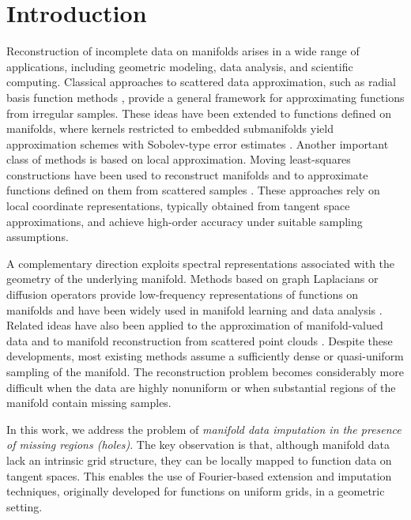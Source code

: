 \documentclass[11pt,oneside,reqno]{amsart}
\theoremstyle{plain}
\numberwithin{equation}{section}
\begin{document}
\section{Introduction}

Reconstruction of incomplete data on manifolds arises in a wide range of applications,
including geometric modeling, data analysis, and scientific computing. Classical
approaches to scattered data approximation, such as radial basis function methods
\cite{Buhmann2003,Wendland2004}, provide a general framework for approximating
functions from irregular samples. These ideas have been extended to functions defined
on manifolds, where kernels restricted to embedded submanifolds yield approximation
schemes with Sobolev-type error estimates \cite{FuselierWright2012}. Another important
class of methods is based on local approximation. Moving least-squares constructions
have been used to reconstruct manifolds and to approximate functions defined on them
from scattered samples \cite{LipmanLevin2010,SoberLevin2016,SoberAizenbudLevin2017}.
These approaches rely on local coordinate representations, typically obtained from
tangent space approximations, and achieve high-order accuracy under suitable sampling
assumptions.

A complementary direction exploits spectral representations associated with the
geometry of the underlying manifold. Methods based on graph Laplacians or diffusion
operators provide low-frequency representations of functions on manifolds and have
been widely used in manifold learning and data analysis \cite{BelkinNiyogi2003,
CoifmanLafon2006}. Related ideas have also been applied to the approximation of
manifold-valued data and to manifold reconstruction from scattered point clouds
\cite{GrohsSprecherYu2017,FaigenbaumGolovinLevin2020}. Despite these developments,
most existing methods assume a sufficiently dense or quasi-uniform sampling of the
manifold. The reconstruction problem becomes considerably more difficult when the data
are highly nonuniform or when substantial regions of the manifold contain missing
samples.

In this work, we address the problem of \emph{manifold data imputation in the presence
of missing regions (holes)}. The key observation is that, although manifold data lack an intrinsic
grid structure, they can be locally mapped to function data on tangent spaces. This
enables the use of Fourier-based extension and imputation techniques, originally
developed for functions on uniform grids, in a geometric setting.
\end{document}

